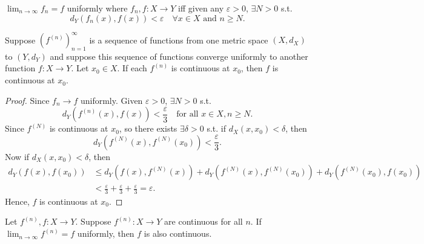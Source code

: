 \begin{prev}
    \(\lim_{n \to \infty} f_n = f \) uniformly where \(f_n, f:X \to Y\) iff given any \(\varepsilon > 0\), \(\exists N > 0\) s.t. 
    \[
        d_Y \left( f_n(x), f(x) \right) < \varepsilon \quad \forall x \in X \text{ and } n \ge N. 
    \]    
\end{prev}

\begin{theorem}[考試會考] \label{thm: uniformly convergence preserves continuity at limit}
    Suppose \(\left( f^{(n)} \right)_{n=1}^{\infty}  \) is a sequence of functions from one metric space \((X, d_X)\) to \((Y, d_Y)\) and suppose this sequence of functions converge uniformly to another function \(f:X \to Y\). Let \(x_0 \in X\). If each \(f^{(n)}\) is continuous at \(x_0\), then \(f\) is continuous at \(x_0\).        
\end{theorem}

\begin{proof}
    Since \(f_n \to f\) uniformly. Given \(\varepsilon > 0\), \(\exists N > 0\) s.t. 
    \[
        d_Y \left( f^{(n)}(x), f(x) \right) < \frac{\varepsilon}{3} \quad \text{for all } x \in X, n \ge N. 
    \]   
    Since \(f^{(N)}\) is continuous at \(x_0\), so there exists \(\exists \delta > 0\) s.t. if \(d_X(x, x_0) < \delta \), then 
    \[
        d_Y \left( f^{(N)}(x), f^{(N)}(x_0) \right) < \frac{\varepsilon}{3}.
    \] 
    Now if \(d_X(x, x_0) < \delta \), then 
    \begin{align*}
        d_Y ( f(x), f(x_0)) &\le d_Y \left( f(x), f^{(N)}(x) \right) + d_Y \left( f^{(N)}(x), f^{(N)}(x_0) \right) + d_Y \left( f^{(N)}(x_0), f(x_0) \right) \\
        &< \frac{\varepsilon}{3} + \frac{\varepsilon}{3} + \frac{\varepsilon}{3} = \varepsilon. 
    \end{align*} 
    Hence, \(f\) is continuous at \(x_0\).   
\end{proof}

\begin{corollary} \label{cl: uniformly convergence preserve continuity}
    Let \(f^{(n)}, f:X \to Y\). Suppose \(f^{(n)}:X \to Y\) are continuous for all \(n\). If \(\lim_{n \to \infty} f^{(n)} = f \) uniformly, then \(f\) is also continuous.     
\end{corollary}

